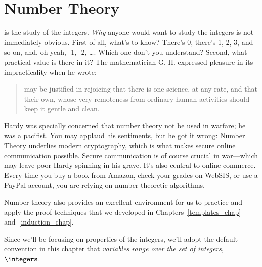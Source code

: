 \chapter{Number Theory}\label{number_theory_chap}

 is the study of the integers.  \emph{Why} anyone
would want to study the integers is not immediately obvious.  First of
all, what's to know?  There's 0, there's 1, 2, 3, and so on, and, oh yeah,
-1, -2, \dots.   Which one don't you understand?  Second, what practical
value is there in it?
The mathematician G. H.  expressed pleasure in its
impracticality when he wrote:
%
 \begin{quotation}
  may be justified in rejoicing that there
 is one science, at any rate, and that their own, whose very remoteness
 from ordinary human activities should keep it gentle and clean.
 \end{quotation}
%

 Hardy was specially concerned that number theory not be used in
 warfare; he was a pacifist.  You may applaud his sentiments, but he
 got it wrong: Number Theory underlies modern cryptography, which is
 what makes secure online communication possible.  Secure
 communication is of course crucial in war---which may leave poor
 Hardy spinning in his grave.  It's also central to online commerce.
 Every time you buy a book from Amazon, check your grades on WebSIS,
 or use a PayPal account, you are relying on number theoretic
 algorithms.

Number theory also provides an excellent environment for us to
practice and apply the proof techniques that we developed in
Chapters~\ref{templates_chap} and~\ref{induction_chap}.

Since we'll be focusing on properties of the integers, we'll adopt
the default convention in this chapter that \emph{variables range over
the set of integers}, $\integers$.



